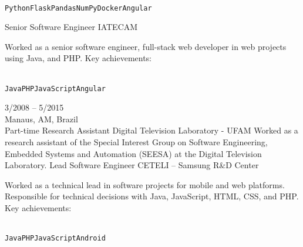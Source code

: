 \documentclass[10pt]{developercv} %
\begin{document}
\begin{entrylist}
{\begin{contributionlist}
    \end{contributionlist}\\
    \texttt{Python}\slashsep\texttt{Flask}\slashsep\texttt{Pandas}\slashsep\texttt{NumPy}\slashsep\texttt{Docker}\slashsep\texttt{Angular}}
  {Senior Software Engineer}
  {IATECAM}
  {
    Worked as a senior software engineer, full-stack web developer in web projects using Java, and PHP. Key achievements:\\
    \begin{contributionlist}
    \end{contributionlist}\\
    \texttt{Java}\slashsep\texttt{PHP}\slashsep\texttt{JavaScript}\slashsep\texttt{Angular}}
  \entry
  {3/2008 -- 5/2015\\\footnotesize{Manaus, AM, Brazil}\\\footnotesize{Part-time}}
  {Research Assistant}
  {Digital Television Laboratory - UFAM}
  {
    Worked as a research assistant of the Special Interest Group on Software Engineering, Embedded Systems and Automation (SEESA) at the Digital Television Laboratory.
  }
  {Lead Software Engineer}
  {CETELI -- Samsung R\&D Center}
  {
    Worked as a technical lead in software projects for mobile and web platforms. Responsible for technical decisions with Java, JavaScript, HTML, CSS, and PHP. Key achievements:\\
    \begin{contributionlist}
    \end{contributionlist}\\
    \texttt{Java}\slashsep\texttt{PHP}\slashsep\texttt{JavaScript}\slashsep\texttt{Android}}

\end{entrylist}
\end{document}
